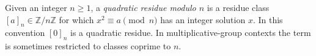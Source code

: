 
Given an integer $n\ge1$, a \emph{quadratic residue modulo $n$} is a residue class $[a]_n\in\mathbb Z/n\mathbb Z$ for which $x^2\equiv a\pmod n$ has an integer solution $x$. In this convention $[0]_n$ is a quadratic residue. In multiplicative-group contexts the term is sometimes restricted to classes coprime to $n$.
